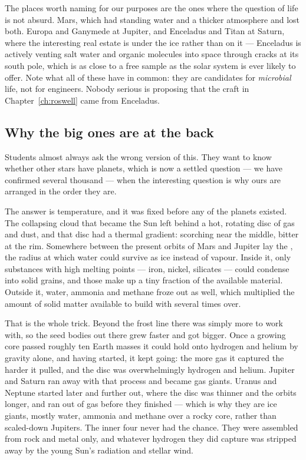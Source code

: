 The places worth naming for our purposes are the ones where the question of life is not
absurd. Mars, which had standing water and a thicker atmosphere and lost both. Europa and
Ganymede at Jupiter, and Enceladus and Titan at Saturn, where the interesting real estate is
under the ice rather than on it --- Enceladus is actively venting salt water and organic
molecules into space through cracks at its south pole, which is as close to a free sample as
the solar system is ever likely to offer. Note what all of these have in common: they are
candidates for \emph{microbial} life, not for engineers. Nobody serious is proposing that the
craft in Chapter~\ref{ch:roswell} came from Enceladus.

\subsection*{Why the big ones are at the back}

Students almost always ask the wrong version of this. They want to know whether other stars
have planets, which is now a settled question --- we have confirmed several thousand --- when
the interesting question is why ours are arranged in the order they are.


The answer is temperature, and it was fixed before any of the planets existed. The collapsing
cloud that became the Sun left behind a hot, rotating disc of gas and dust, and that disc had a
thermal gradient: scorching near the middle, bitter at the rim. Somewhere between the present
orbits of Mars and Jupiter lay the , the radius at which water could survive
as ice instead of vapour. Inside it, only substances with high melting points --- iron,
nickel, silicates --- could condense into solid grains, and those make up a tiny fraction of
the available material. Outside it, water, ammonia and methane froze out as well, which
multiplied the amount of solid matter available to build with several times over.

That is the whole trick. Beyond the frost line there was simply more to work with, so the
seed bodies out there grew faster and got bigger. Once a growing core passed roughly ten Earth
masses it could hold onto hydrogen and helium by gravity alone, and having started, it kept
going: the more gas it captured the harder it pulled, and the disc was overwhelmingly hydrogen
and helium. Jupiter and Saturn ran away with that process and became gas giants. Uranus and
Neptune started later and further out, where the disc was thinner and the orbits longer, and
ran out of gas before they finished --- which is why they are ice giants, mostly water,
ammonia and methane over a rocky core, rather than scaled-down Jupiters. The inner four never
had the chance. They were assembled from rock and metal only, and whatever hydrogen they did
capture was stripped away by the young Sun's radiation and stellar wind.

